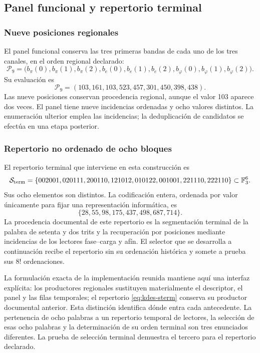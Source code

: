 \subsection{Panel funcional y repertorio terminal}

\subsubsection{Nueve posiciones regionales}

El panel funcional conserva las tres primeras bandas de cada uno de los
tres canales, en el orden regional declarado:
\begin{equation}
 \mathcal P_9=
 \bigl(b_\pi(0),b_\pi(1),b_\pi(2),
       b_e(0),b_e(1),b_e(2),
       b_\varphi(0),b_\varphi(1),b_\varphi(2)\bigr).
 \label{eq:kdes-panel}
\end{equation}
Su evaluación es
\[
 \mathcal P_9=(103,161,103,523,457,301,450,398,438).
\]
Las nueve posiciones conservan procedencia regional, aunque el valor
103 aparece dos veces. El panel tiene nueve incidencias ordenadas y
ocho valores distintos. La enumeración ulterior emplea las incidencias;
la deduplicación de candidatos se efectúa en una etapa posterior.

\subsubsection{Repertorio no ordenado de ocho bloques}

El repertorio terminal que interviene en esta construcción es
\begin{equation}
 \mathcal S_{\rm term}=
 \{002001,020111,200110,121012,
   010122,001001,221110,222110\}\subset\mathbb F_3^6.
 \label{eq:kdes-sterm}
\end{equation}
Sus ocho elementos son distintos. La codificación entera, ordenada por
valor únicamente para fijar una representación informática, es
\[
 \{28,55,98,175,437,498,687,714\}.
\]
La procedencia documental de este repertorio es la segmentación terminal
de la palabra de setenta y dos trits y la recuperación por posiciones
mediante incidencias de los lectores fase--carga y afín. El selector que
se desarrolla a continuación recibe el repertorio sin su ordenación
histórica y somete a prueba sus $8!$ ordenaciones.

La formulación exacta de la implementación reunida mantiene aquí una
interfaz explícita: los productores regionales sustituyen materialmente
el descriptor, el panel y las filas temporales; el repertorio
\eqref{eq:kdes-sterm} conserva su productor documental anterior. Esta
distinción identifica dónde entra cada antecedente. La pertenencia de
ocho palabras a un repertorio temporal de lectores, la selección de esas
ocho palabras y la determinación de su orden terminal son tres
enunciados diferentes. La prueba de selección terminal demuestra el
tercero para el repertorio declarado.

